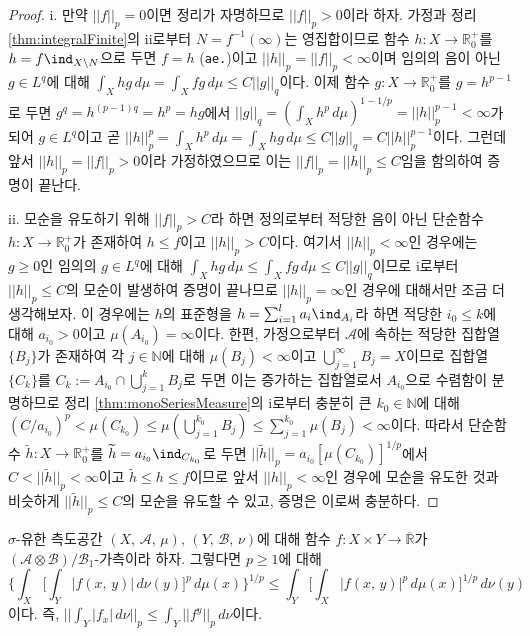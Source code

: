 \begin{proof}
    i. 만약 $||f||_p=0$이면 정리가 자명하므로 $||f||_p>0$이라 하자. 가정과 정리 \ref{thm:integralFinite}의 ii로부터 $N=f^{-1}(\infty)$는 영집합이므로 함수 $h:X\to\mathbb{R}^+_0$를 $h=f\ind_{X\setminus N}$으로 두면 $f=h$ (\texttt{ae.})이고 $||h||_p=||f||_p<\infty$이며 임의의 음이 아닌 $g\in L^q$에 대해 $\int_Xhg\,d\mu=\int_Xfg\,d\mu\leq C||g||_q$이다. 이제 함수 $g:X\to\mathbb{R}^+_0$를 $g=h^{p-1}$로 두면 $g^q=h^{(p-1)q}=h^p=hg$에서 $||g||_q=(\int_Xh^p\,d\mu)^{1-1/p}=||h||_p^{p-1}<\infty$가 되어 $g\in L^q$이고 곧 $||h||_p^p=\int_Xh^p\,d\mu=\int_Xhg\,d\mu\leq C||g||_q=C||h||_p^{p-1}$이다. 그런데 앞서 $||h||_p=||f||_p>0$이라 가정하였으므로 이는 $||f||_p=||h||_p\leq C$임을 함의하여 증명이 끝난다.

    ii. 모순을 유도하기 위해 $||f||_p>C$라 하면 정의로부터 적당한 음이 아닌 단순함수 $h:X\to\mathbb{R}^+_0$가 존재하여 $h\leq f$이고 $||h||_p>C$이다. 여기서 $||h||_p<\infty$인 경우에는 $g\geq0$인 임의의 $g\in L^q$에 대해 $\int_Xhg\,d\mu\leq\int_Xfg\,d\mu\leq C||g||_q$이므로 i로부터 $||h||_p\leq C$의 모순이 발생하여 증명이 끝나므로 $||h||_p=\infty$인 경우에 대해서만 조금 더 생각해보자. 이 경우에는 $h$의 표준형을 $h=\sum_{i=1}^la_i\ind_{A_i}$라 하면 적당한 $i_0\leq k$에 대해 $a_{i_0}>0$이고 $\mu(A_{i_0})=\infty$이다. 한편, 가정으로부터 $\mathcal{A}$에 속하는 적당한 집합열 $\{B_j\}$가 존재하여 각 $j\in\mathbb{N}$에 대해 $\mu(B_j)<\infty$이고 $\bigcup_{j=1}^\infty B_j=X$이므로 집합열 $\{C_k\}$를 $C_k:=A_{i_0}\cap\bigcup_{j=1}^kB_j$로 두면 이는 증가하는 집합열로서 $A_{i_0}$으로 수렴함이 분명하므로 정리 \ref{thm:monoSeriesMeasure}의 i로부터 충분히 큰 $k_0\in\mathbb{N}$에 대해 $(C/a_{i_0})^p<\mu(C_{k_0})\leq\mu(\bigcup_{j=1}^{k_0}B_j)\leq\sum_{j=1}^{k_0}\mu(B_j)<\infty$이다. 따라서 단순함수 $\widetilde{h}:X\to\mathbb{R}^+_0$를 $\widetilde{h}=a_{i_0}\ind_{C_{k_0}}$로 두면 $||\widetilde{h}||_p=a_{i_0}[\mu(C_{k_0})]^{1/p}
    $에서 $C<||\widetilde{h}||_p<\infty$이고 $\widetilde{h}\leq h\leq f$이므로 앞서 $||h||_p<\infty$인 경우에 모순을 유도한 것과 비슷하게 $||\widetilde{h}||_p\leq C$의 모순을 유도할 수 있고, 증명은 이로써 충분하다.
\end{proof}

\begin{theorem}
    $\sigma$-유한 측도공간 $(X,\,\mathcal{A},\,\mu),\,(Y,\,\mathcal{B},\,\nu)$에 대해 함수 $f:X\times Y\to\overline{\mathbb{R}}$가 $(\mathcal{A}\otimes\mathcal{B})/\mathcal{B}_1$-가측이라 하자. 그렇다면 $p\geq1$에 대해
    \begin{equation*}
        \bigg\{\int_X\bigg[\int_Y|f(x,\,y)|\,d\nu(y)\bigg]^p\,d\mu(x)\bigg\}^{1/p}\leq\int_Y\bigg[\int_X|f(x,\,y)|^p\,d\mu(x)\bigg]^{1/p}\,d\nu(y)
    \end{equation*}
    이다. 즉, $||\int_Y|f_x|\,d\nu||_p\leq\int_Y||f^y||_p\,d\nu$이다.
\end{theorem}

